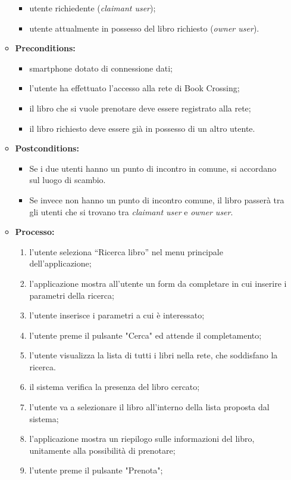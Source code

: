 \begin{itemize}
\begin{itemize}
		\begin{itemize}
			\item utente richiedente (\textit{claimant user});
			\item utente attualmente in possesso del libro richiesto (\textit{owner user}).
		\end{itemize}
		\item \textbf{Preconditions:}
		\begin{itemize}
			\item smartphone dotato di connessione dati;
			\item l’utente ha effettuato l’accesso alla rete di Book Crossing;
			\item il libro che si vuole prenotare deve essere registrato alla rete;
			\item il libro richiesto deve essere già in possesso di un altro utente.
		\end{itemize}
		\item \textbf{Postconditions:}
		\begin{itemize}
			\item Se i due utenti hanno un punto di incontro in comune, si accordano sul luogo di scambio. 
			\item Se invece non hanno un punto di incontro comune, il libro passerà tra gli utenti che si trovano tra \textit{claimant user} e \textit{owner user}.
		\end{itemize}
		\item \textbf{Processo:}
		\begin{enumerate}
			\item l’utente seleziona “Ricerca libro” nel menu principale dell’applicazione;
			\item l’applicazione mostra all'utente un form da completare in cui inserire i parametri della ricerca;
			\item l’utente inserisce i parametri a cui è interessato;
			\item l'utente preme il pulsante "Cerca" ed attende il completamento;
			\item l'utente visualizza la lista di tutti i libri nella rete, che soddisfano la ricerca.
			\item il sistema verifica la presenza del libro cercato;
			\item l'utente va a selezionare il libro all'interno della lista proposta dal sistema;
			\item l'applicazione mostra un riepilogo sulle informazioni del libro, unitamente alla possibilità di prenotare;
			\item l'utente preme il pulsante "Prenota";

\end{enumerate}
\end{itemize}
\end{itemize}
